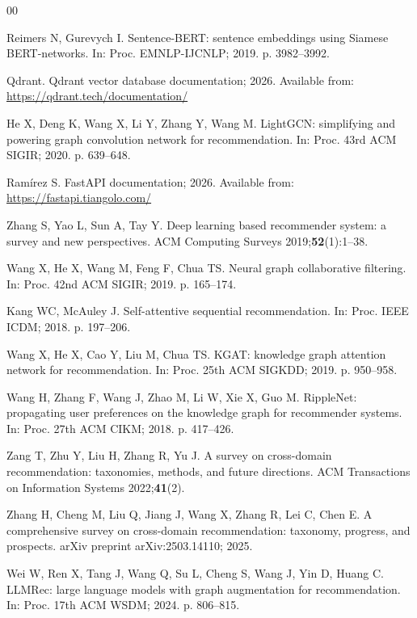 \documentclass[3p,times,procedia]{elsarticle}
\begin{document}
\begin{thebibliography}{00}

Reimers N, Gurevych I. Sentence-BERT: sentence embeddings using Siamese BERT-networks. In: Proc. EMNLP-IJCNLP; 2019. p. 3982--3992.

Qdrant. Qdrant vector database documentation; 2026. Available from: \url{https://qdrant.tech/documentation/}

He X, Deng K, Wang X, Li Y, Zhang Y, Wang M. LightGCN: simplifying and powering graph convolution network for recommendation. In: Proc. 43rd ACM SIGIR; 2020. p. 639--648.

Ram\'irez S. FastAPI documentation; 2026. Available from: \url{https://fastapi.tiangolo.com/}

Zhang S, Yao L, Sun A, Tay Y. Deep learning based recommender system: a survey and new perspectives. ACM Computing Surveys 2019;\textbf{52}(1):1--38.

Wang X, He X, Wang M, Feng F, Chua TS. Neural graph collaborative filtering. In: Proc. 42nd ACM SIGIR; 2019. p. 165--174.

Kang WC, McAuley J. Self-attentive sequential recommendation. In: Proc. IEEE ICDM; 2018. p. 197--206.

Wang X, He X, Cao Y, Liu M, Chua TS. KGAT: knowledge graph attention network for recommendation. In: Proc. 25th ACM SIGKDD; 2019. p. 950--958.

Wang H, Zhang F, Wang J, Zhao M, Li W, Xie X, Guo M. RippleNet: propagating user preferences on the knowledge graph for recommender systems. In: Proc. 27th ACM CIKM; 2018. p. 417--426.

Zang T, Zhu Y, Liu H, Zhang R, Yu J. A survey on cross-domain recommendation: taxonomies, methods, and future directions. ACM Transactions on Information Systems 2022;\textbf{41}(2).

Zhang H, Cheng M, Liu Q, Jiang J, Wang X, Zhang R, Lei C, Chen E. A comprehensive survey on cross-domain recommendation: taxonomy, progress, and prospects. arXiv preprint arXiv:2503.14110; 2025.

Wei W, Ren X, Tang J, Wang Q, Su L, Cheng S, Wang J, Yin D, Huang C. LLMRec: large language models with graph augmentation for recommendation. In: Proc. 17th ACM WSDM; 2024. p. 806--815.


\end{thebibliography}
\end{document}
